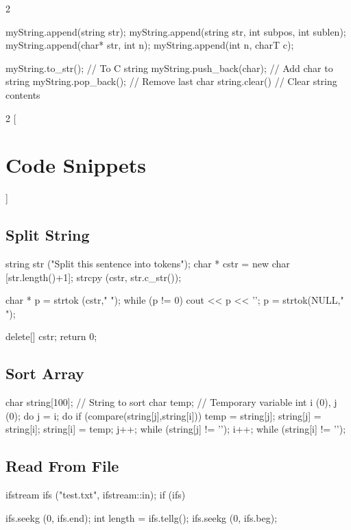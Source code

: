 \documentclass[10pt,a4paper]{extarticle}
\begin{document}
\begin{multicols}{2}
\begin{cppcode}
  myString.append(string str);
  myString.append(string str, int subpos, int sublen);
  myString.append(char* str, int n);
  myString.append(int n, charT c);

  myString.to_str();        // To C string
  myString.push_back(char); // Add char to string
  myString.pop_back();      // Remove last char
  string.clear()            // Clear string contents
\end{cppcode}
\end{multicols}

\pagebreak

\begin{multicols}{2}
[\section*{Code Snippets}]


\subsection*{Split String}
\begin{cppcode}
  string str ("Split this sentence into tokens");
  char * cstr = new char [str.length()+1];
  strcpy (cstr, str.c_str());

  char * p = strtok (cstr," ");
  while (p != 0){
    cout << p << '\n';
    p = strtok(NULL," ");
  }

  delete[] cstr;
  return 0;
\end{cppcode}

\subsection*{Sort Array}
\begin{cppcode}
  char string[100];   // String to sort
  char temp;          // Temporary variable
  int i (0), j (0);
  do {
    j = i;
    do {
      if (compare(string[j],string[i])){
        temp = string[j];
        string[j] = string[i];
        string[i] = temp;
      } 
      j++;
    } while (string[j] != '\0');
    i++;
  } while (string[i] != '\0');
\end{cppcode}

\subsection*{Read From File}
\begin{cppcode}
  ifstream ifs ("test.txt", ifstream::in);
  if (ifs) {
    ifs.seekg (0, ifs.end);
    int length = ifs.tellg();
    ifs.seekg (0, ifs.beg);

}
\end{cppcode}
\end{multicols}
\end{document}
